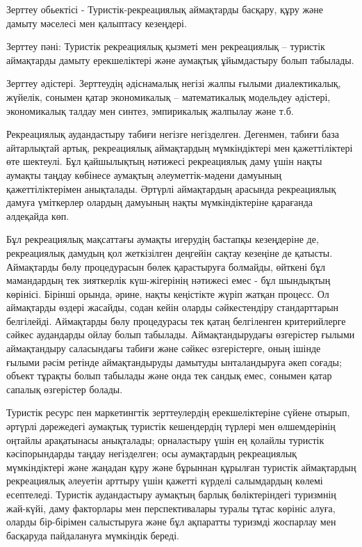 Зерттеу обьектісі - Туристік-рекреациялық аймақтарды басқару, құру және
дамыту мәселесі мен қалыптасу кезеңдері.

Зерттеу пәні: Туристік рекреациялық қызметі мен рекреациялық -- туристік
аймақтарды дамыту ерекшеліктері және аумақтық ұйымдастыру болып
табылады.

Зерттеу әдістері. Зерттеудің әдіснамалық негізі жалпы ғылыми
диалектикалық, жүйелік, сонымен қатар экономикалық -- математикалық
модельдеу әдістері, экономикалық талдау мен синтез, эмпирикалық жалпылау
және т.б.

Рекреациялық аудандастыру табиғи негізге негізделген. Дегенмен, табиғи
база айтарлықтай артық, рекреациялық аймақтардың мүмкіндіктері мен
қажеттіліктері өте шектеулі. Бұл қайшылықтың нәтижесі рекреациялық даму
үшін нақты аумақты таңдау көбінесе аумақтың әлеуметтік-мәдени дамуының
қажеттіліктерімен анықталады. Әртүрлі аймақтардың арасында рекреациялық
дамуға үміткерлер олардың дамуының нақты мүмкіндіктеріне қарағанда
әлдеқайда көп.

Бұл рекреациялық мақсаттағы аумақты игерудің бастапқы кезеңдеріне де,
рекреациялық дамудың қол жеткізілген деңгейін сақтау кезеңіне де
қатысты. Аймақтарды бөлу процедурасын бөлек қарастыруға болмайды,
өйткені бұл мамандардың тек зияткерлік күш-жігерінің нәтижесі емес - бұл
шындықтың көрінісі. Бірінші орында, әрине, нақты кеңістікте жүріп жатқан
процесс. Ол аймақтарды өздері жасайды, содан кейін оларды сәйкестендіру
стандарттарын белгілейді. Аймақтарды бөлу процедурасы тек қатаң
белгіленген критерийлерге сәйкес аудандарды ойлау болып табылады.
Аймақтандырудағы өзгерістер ғылыми аймақтандыру саласындағы табиғи және
сәйкес өзгерістерге, оның ішінде ғылыми рәсім ретінде аймақтандыруды
дамытуды ынталандыруға әкеп соғады; объект тұрақты болып табылады және
онда тек сандық емес, сонымен қатар сапалық өзгерістер болады.

Туристік ресурс пен маркетингтік зерттеулердің ерекшеліктеріне сүйене
отырып, әртүрлі дәрежедегі аумақтық туристік кешендердің түрлері мен
өлшемдерінің оңтайлы арақатынасы анықталады; орналастыру үшін ең қолайлы
туристік кәсіпорындарды таңдау негізделген; осы аумақтардың рекреациялық
мүмкіндіктері және жаңадан құру және бұрыннан құрылған туристік
аймақтардың рекреациялық әлеуетін арттыру үшін қажетті күрделі
салымдардың көлемі есептеледі. Туристік аудандастыру аумақтың барлық
бөліктеріндегі туризмнің жай-күйі, даму факторлары мен перспективалары
туралы тұтас көрініс алуға, оларды бір-бірімен салыстыруға және бұл
ақпаратты туризмді жоспарлау мен басқаруда пайдалануға мүмкіндік береді.

